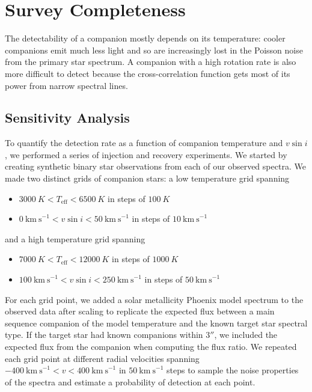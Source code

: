 \documentclass{emulateapj}
\begin{document}
\section{Survey Completeness}
\label{sec:completeness}

The detectability of a companion mostly depends on its temperature: cooler companions emit much less light and so are increasingly lost in the Poisson noise from the primary star spectrum. A companion with a high rotation rate is also more difficult to detect because the cross-correlation function gets most of its power from narrow spectral lines.  

\subsection{Sensitivity Analysis}

To quantify the detection rate as a function of companion temperature and $v\sin{i}$, we performed a series of injection and recovery experiments. We started by creating synthetic binary star observations from each of our observed spectra. We made two distinct grids of companion stars: a low temperature grid spanning

\begin{itemize}
\item $3000\ K < T_\mathrm{eff} < 6500\ K$ in steps of $100\ K$
\item $0\ \mathrm{km\ s}^{-1} < v\sin{i} < 50\ \mathrm{km\ s}^{-1}$ in steps of $10\ \mathrm{km\ s}^{-1}$
\end{itemize}
and a high temperature grid spanning

\begin{itemize}
\item $7000\ K < T_\mathrm{eff} < 12000\ K$ in steps of $1000\ K$
\item $100\ \mathrm{km\ s}^{-1} < v\sin{i} < 250\ \mathrm{km\ s}^{-1}$ in steps of $50\ \mathrm{km\ s}^{-1}$
\end{itemize}
For each grid point, we added a solar metallicity Phoenix model spectrum to the observed data after scaling to replicate the expected flux between a main sequence companion of the model temperature and the known target star spectral type. If the target star had known companions within $3''$, we included the expected flux from the companion when computing the flux ratio. We repeated each grid point at different radial velocities spanning $-400\ \mathrm{km\ s}^{-1} < v < 400\ \mathrm{km\ s}^{-1}$ in $50\ \mathrm{km\ s}^{-1}$ steps to sample the noise properties of the spectra and estimate a probability of detection at each point.
\end{document}
